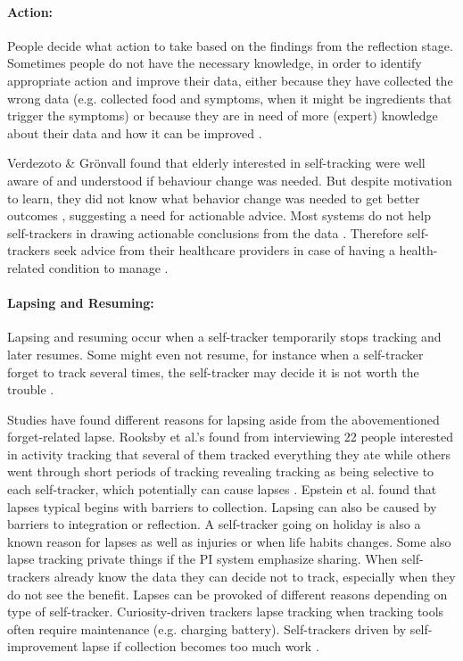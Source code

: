 \paragraph{Action:}
People decide what action to take based on the findings from the reflection stage. Sometimes people do not have the necessary knowledge, in order to identify appropriate action and improve their data, either because they have collected the wrong data \citep{Choe2014, Chung2015} (e.g. collected food and symptoms, when it might be ingredients that trigger the symptoms) or because they are in need of more (expert) knowledge about their data and how it can be improved \citep{Verdezoto2015, Li2010, Oh2015}. 

Verdezoto \& Gr{\"o}nvall found that elderly interested in self-tracking were well aware of and understood if behaviour change was needed. But despite motivation to learn, they did not know what behavior change was needed to get better outcomes \citep{Verdezoto2015}, suggesting a need for actionable advice. Most systems do not help self-trackers in drawing actionable conclusions from the data \citep{Chung2015, Li2010}. Therefore self-trackers seek advice from their healthcare providers in case of having a health-related condition to manage \citep{Li2010}. 

\paragraph{Lapsing and Resuming:}
Lapsing and resuming occur when a self-tracker temporarily stops tracking and later resumes. Some might even not resume, for instance when a self-tracker forget to track several times, the self-tracker may decide it is not worth the trouble \citep{Epstein2015}. 

Studies have found different reasons for lapsing aside from the abovementioned forget-related lapse. Rooksby et al.'s found from interviewing 22 people interested in activity tracking that several of them tracked everything they ate while others went through short periods of tracking revealing tracking as being selective to each self-tracker, which potentially can cause lapses \citep{Rooksby2014}. Epstein et al. found that lapses typical begins with barriers to collection. Lapsing can also be caused by barriers to integration or reflection. A self-tracker going on holiday is also a known reason for lapses as well as injuries or when life habits changes. Some also lapse tracking private things if the PI system emphasize sharing. When self-trackers already know the data they can decide not to track, especially when they do not see the benefit. Lapses can be provoked of different reasons depending on type of self-tracker. Curiosity-driven trackers lapse tracking when tracking tools often require maintenance (e.g. charging battery). Self-trackers driven by self-improvement lapse if collection becomes too much work \citep{Epstein2015}. 

